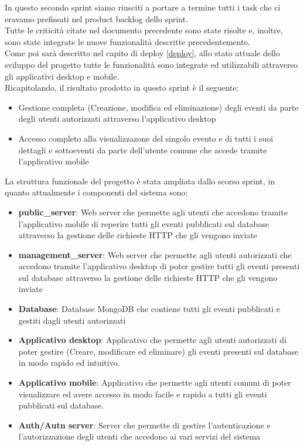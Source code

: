 \documentclass{article}
\begin{document}
In questo secondo sprint siamo riusciti a portare a termine tutti i task che ci eravamo prefissati nel product backlog dello sprint.\\  
Tutte le criticità citate nel documento precedente sono state risolte e, inoltre, sono state integrate le nuove funzionalità descritte precedentemente.\\
Come poi sarà descritto nel capito di deploy \ref{deploy}, allo stato attuale dello sviluppo del progetto tutte le funzionalità sono integrate ed utilizzabili attraverso gli applicativi desktop e mobile.\\

\noindent Ricapitolando, il risultato prodotto in questo sprint è il seguente:
\begin{itemize}
    \item Gestione completa (Creazione, modifica ed eliminazione) degli eventi da parte degli utenti autorizzati attraverso l'applicativo desktop
    \item Accesso completo alla visualizzazone del singolo evento e di tutti i suoi dettagli e sottoeventi da parte dell'utente comune che accede tramite l'applicativo mobile
\end{itemize}

\noindent La struttura funzionale del progetto è stata ampliata dallo scorso sprint, in quanto attualmente i componenti del sistema sono:

\begin{itemize}
    \item \textbf{public\_server}: Web server che permette agli utenti che accedono tramite l'applicativo mobile di reperire tutti gli eventi pubblicati sul database attraverso la gestione delle richieste HTTP che gli vengono inviate
    \item \textbf{management\_server}: Web server che permette agli utenti autorizzati che accedono tramite l'applicativo desktop di poter gestire tutti gli eventi presenti sul database attraverso la gestione delle richieste HTTP che gli vengono inviate
    \item \textbf{Database}: Database MongoDB che contiene tutti gli eventi pubblicati e gestiti dagli utenti autorizzati
    \item \textbf{Applicativo desktop}: Applicativo che permette agli utenti autorizzati di poter gestire (Creare, modificare ed eliminare) gli eventi presenti sul database in modo rapido ed intuitivo.
    \item \textbf{Applicativo mobile}: Applicativo che permette agli utenti comuni di poter visualizzare ed avere accesso in modo facile e rapido a tutti gli eventi pubblicati sul database.
    \item \textbf{Auth/Autn server}: Server che permette di gestire l'autenticazione e l'autorizzazione degli utenti che accedono ai vari servizi del sistema
\end{itemize}
\end{document}
